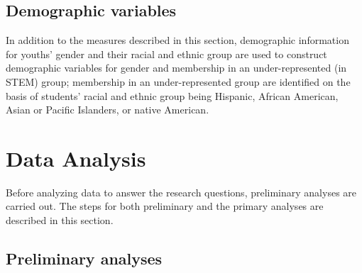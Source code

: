 \documentclass[]{book}
\theoremstyle{definition}
\theoremstyle{definition}
\theoremstyle{definition}
\theoremstyle{remark}
\begin{document}
\begin{table}

\caption{\label{tab:unnamed-chunk-7}Coding Frame for Instructional Support for Work With Data}
\centering
{}
\end{table}

\subsection{Demographic variables}\label{demographic-variables}

In addition to the measures described in this section, demographic
information for youths' gender and their racial and ethnic group are
used to construct demographic variables for gender and membership in an
under-represented (in STEM) group; membership in an under-represented
group are identified on the basis of students' racial and ethnic group
being Hispanic, African American, Asian or Pacific Islanders, or native
American.

\section{Data Analysis}\label{data-analysis}

Before analyzing data to answer the research questions, preliminary
analyses are carried out. The steps for both preliminary and the primary
analyses are described in this section.

\subsection{Preliminary analyses}\label{preliminary-analyses}
\end{document}
